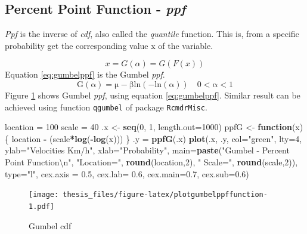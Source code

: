 \documentclass[12pt,oneside]{reedthesis}
\newenvironment{Shaded}{\begin{snugshade}}{\end{snugshade}}
\newcommand{\CharTok}[1]{\textcolor[rgb]{0.31,0.60,0.02}{#1}}
\newcommand{\ControlFlowTok}[1]{\textcolor[rgb]{0.13,0.29,0.53}{\textbf{#1}}}
\newcommand{\DataTypeTok}[1]{\textcolor[rgb]{0.13,0.29,0.53}{#1}}
\newcommand{\DecValTok}[1]{\textcolor[rgb]{0.00,0.00,0.81}{#1}}
\newcommand{\FloatTok}[1]{\textcolor[rgb]{0.00,0.00,0.81}{#1}}
\newcommand{\KeywordTok}[1]{\textcolor[rgb]{0.13,0.29,0.53}{\textbf{#1}}}
\newcommand{\NormalTok}[1]{#1}
\newcommand{\OperatorTok}[1]{\textcolor[rgb]{0.81,0.36,0.00}{\textbf{#1}}}
\newcommand{\StringTok}[1]{\textcolor[rgb]{0.31,0.60,0.02}{#1}}
\begin{document}
\hypertarget{percent-point-function---ppf}{%
\subsection{\texorpdfstring{Percent Point Function - \emph{ppf}}{Percent Point Function - ppf}}\label{percent-point-function---ppf}}

\emph{Ppf} is the inverse of \emph{cdf}, also called the \emph{quantile} function. This is, from a specific probability get the corresponding value x of the variable.

\[
x = G(\alpha) = G(F(x))
\]
Equation \eqref{eq:gumbelppf} is the Gumbel \emph{ppf}.
\begin{equation}
\mathrm{
        G(\alpha) = \mu-\beta ln(-ln(\alpha))
        \quad 0 < \alpha < 1
        }
  \label{eq:gumbelppf}
\end{equation}
Figure \ref{fig:plotgumbelppffunction} shows Gumbel \emph{ppf}, using equation \eqref{eq:gumbelppf}. Similar result can be achieved using function \texttt{qgumbel} of package \texttt{RcmdrMisc}.

\footnotesize
\begin{Shaded}
\begin{Highlighting}[]
\NormalTok{location =}\StringTok{ }\DecValTok{100}
\NormalTok{scale =}\StringTok{ }\DecValTok{40}
\NormalTok{.x <-}\StringTok{ }\KeywordTok{seq}\NormalTok{(}\DecValTok{0}\NormalTok{, }\DecValTok{1}\NormalTok{, }\DataTypeTok{length.out=}\DecValTok{1000}\NormalTok{)}
\NormalTok{ppfG <-}\StringTok{ }\ControlFlowTok{function}\NormalTok{(x) \{}
\NormalTok{  location }\OperatorTok{-}\StringTok{ }\NormalTok{(scale}\OperatorTok{*}\KeywordTok{log}\NormalTok{(}\OperatorTok{-}\KeywordTok{log}\NormalTok{(x)))}
\NormalTok{  \}}
\NormalTok{.y =}\StringTok{ }\KeywordTok{ppfG}\NormalTok{(.x)}
\KeywordTok{plot}\NormalTok{(.x, .y, }\DataTypeTok{col=}\StringTok{"green"}\NormalTok{, }\DataTypeTok{lty=}\DecValTok{4}\NormalTok{, }
     \DataTypeTok{ylab=}\StringTok{"Velocities Km/h"}\NormalTok{, }\DataTypeTok{xlab=}\StringTok{"Probability"}\NormalTok{, }
     \DataTypeTok{main=}\KeywordTok{paste}\NormalTok{(}\StringTok{"Gumbel - Percent Point Function}\CharTok{\textbackslash{}n}\StringTok{"}\NormalTok{, }\StringTok{"Location="}\NormalTok{, }
     \KeywordTok{round}\NormalTok{(location,}\DecValTok{2}\NormalTok{), }\StringTok{" Scale="}\NormalTok{, }\KeywordTok{round}\NormalTok{(scale,}\DecValTok{2}\NormalTok{)), }\DataTypeTok{type=}\StringTok{"l"}\NormalTok{, }
     \DataTypeTok{cex.axis =} \FloatTok{0.5}\NormalTok{, }\DataTypeTok{cex.lab=} \FloatTok{0.6}\NormalTok{, }\DataTypeTok{cex.main=}\FloatTok{0.7}\NormalTok{, }\DataTypeTok{cex.sub=}\FloatTok{0.6}\NormalTok{)}
\end{Highlighting}
\end{Shaded}
\begin{figure}
\centering
\texttt{[image: thesis\_files/figure-latex/plotgumbelppffunction-1.pdf]}
\caption{\label{fig:plotgumbelppffunction}Gumbel cdf}
\end{figure}
\normalsize
\end{document}
